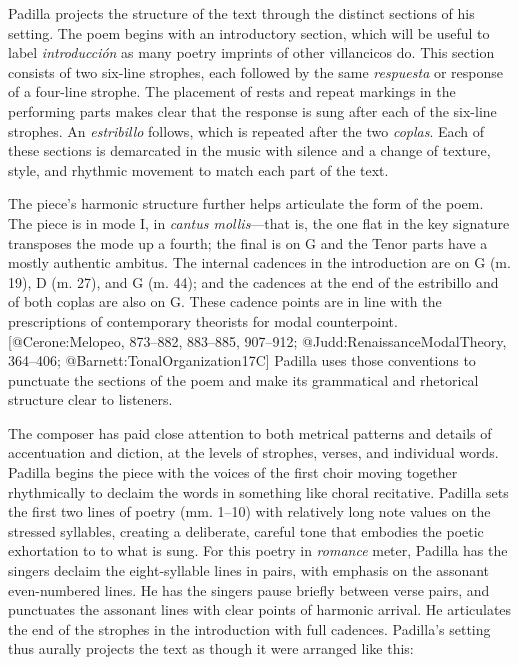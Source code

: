 Padilla projects the structure of the text through the distinct sections of his
setting.
The poem begins with an introductory section, which will be useful to label
\emph{introducción} as many poetry imprints of other villancicos do.
This section consists of two six-line strophes, each followed by the
same \emph{respuesta} or response of a four-line strophe.
The placement of rests and repeat markings in the performing parts makes clear
that the response is sung after each of the six-line strophes.
An \emph{estribillo} follows, which is repeated after the two \emph{coplas}.
Each of these sections is demarcated in the music with silence and a change of
texture, style, and rhythmic movement to match each part of the text.

The piece's harmonic structure further helps articulate the form of the poem.
The piece is in mode I, in \emph{cantus mollis}---that is, the one flat in the
key signature transposes the mode up a fourth; the final is on G and the Tenor
parts have a mostly authentic ambitus.
The internal cadences in the introduction are on G (m. 19), D (m. 27), and G
(m. 44); and the cadences at the end of the estribillo and of both coplas are
also on G.
These cadence points are in line with the prescriptions of contemporary
theorists for modal counterpoint.
[@Cerone:Melopeo, 873--882, 883--885, 907--912; @Judd:RenaissanceModalTheory,
364--406; @Barnett:TonalOrganization17C]
Padilla uses those conventions to punctuate the sections of the poem and make
its grammatical and rhetorical structure clear to listeners.

The composer has paid close attention to both metrical patterns and details of
accentuation and diction, at the levels of strophes, verses, and individual
words.
Padilla begins the piece with the voices of the first choir moving together
rhythmically to declaim the words in something like choral recitative.
Padilla sets the first two lines of poetry (mm. 1--10) with relatively long note
values on the stressed syllables, creating a deliberate, careful tone that
embodies the poetic exhortation to  to what is sung.
For this poetry in \emph{romance} meter, Padilla has the singers declaim the
eight-syllable lines in pairs, with emphasis on the assonant even-numbered
lines.
He has the singers pause briefly between verse pairs, and punctuates the
assonant lines with clear points of harmonic arrival.
He articulates the end of the strophes in the introduction with full
cadences.
Padilla's setting thus aurally projects the text as though it were arranged like
this:

